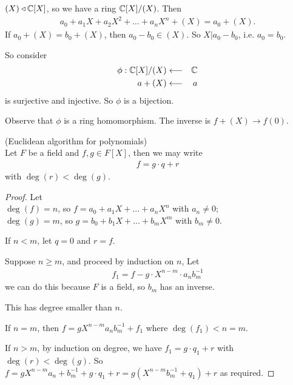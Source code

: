 \documentclass[a4paper]{article}
\begin{document}
\begin{eg}
$(X) \triangleleft \mathbb{C}[X]$, so we have a ring $\mathbb{C}[X] / (X)$. Then
\begin{equation*}
\begin{aligned}
a_0+a_1X+a_2X^2+...+a_nX^n + (X) = a_0 + (X).
\end{aligned}
\end{equation*}
If $a_0+(X) = b_0+(X)$, then $a_0-b_0 \in (X)$. So $X | a_0-b_0$, i.e. $a_0=b_0$.

So consider
\begin{equation*}
\begin{aligned}
\phi: \mathbb{C}[X] / (X) &\longleftarrow &\mathbb{C}\\
a+(X) & \longleftarrow & a
\end{aligned}
\end{equation*}
is surjective and injective. So $\phi$ is a bijection.

Observe that $\phi$ is a ring homomorphism. The inverse is $f+(X) \to f(0)$.
\end{eg}

\begin{prop} (Euclidean algorithm for polynomials)\\
Let $F$ be a field and $f,g \in F[X]$, then we may write
\begin{equation*}
\begin{aligned}
f = g\cdot q + r
\end{aligned}
\end{equation*}
with $\deg(r) < \deg(g)$.
\begin{proof}
Let\\
$\deg(f) = n$, so $f=a_0+a_1X + ... + a_nX^n$ with $a_n \neq 0$;\\
$\deg(g) = m$, so $g=b_0+b_1X + ... + b_mX^m$ with $b_m \neq 0$.

If $n<m$, let $q=0$ and $r=f$.

Suppose $n \geq m$, and proceed by induction on $n$, Let
\begin{equation*}
\begin{aligned}
f_1 = f-g \cdot X^{n-m} \cdot a_n b_m^{-1}
\end{aligned}
\end{equation*}
we can do this because $F$ is a field, so $b_m$ has an inverse.

This has degree smaller than $n$.

If $n=m$, then $f = gX^{n-m}a_nb_m^{-1} + f_1$ where $\deg(f_1)<n=m$.

If $n>m$, by induction on degree, we have $f_1 = g\cdot q_1 + r$ with $\deg(r) < \deg(g)$. So $f=gX^{n-m}a_n+b_m^{-1} + g\cdot q_1+r = g (X^{n-m}b_m^{-1} + q_1) +r$ as required.
\end{proof}
\end{prop}
\end{document}
